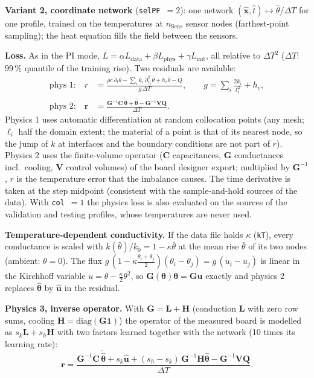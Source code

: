 \documentclass[11pt,a4paper]{article}
\newcommand{\mat}[1]{\bm{#1}}
\newcommand{\cfg}[1]{\texttt{#1}}
\begin{document}
\textbf{Variant 2, coordinate network} (\cfg{selPF}~$=2$): one network $(\hat{\bm x},\hat t)\mapsto\hat\theta/\Delta T$
for one profile, trained on the temperatures at $n_{\mathrm{Sens}}$ sensor nodes (farthest-point sampling); the heat
equation fills the field between the sensors.

\textbf{Loss.} As in the PI mode, $L=\alpha L_{\mathrm{data}}+\beta L_{\mathrm{phys}}+\gamma L_{\mathrm{init}}$, all
relative to $\Delta T^2$ ($\Delta T$: 99\,\% quantile of the training rise). Two residuals are available:
\begin{align}
  \text{phys 1:}\quad r&=\frac{\rho c\,\partial_t\hat\theta-\sum_i k_i\,\partial^2_{x_i}\hat\theta+h_v\hat\theta-Q}
  {g\,\Delta T},\qquad g=\sum_i\frac{2k_i}{\ell_i^2}+h_v,\\
  \text{phys 2:}\quad \bm r&=\frac{\mat G^{-1}\mat C\,\dot{\hat{\bm\theta}}+\hat{\bm\theta}-\mat G^{-1}\mat V\bm Q}
  {\Delta T}.
\end{align}
Physics 1 uses automatic differentiation at random collocation points (any mesh; $\ell_i$ half the domain extent; the
material of a point is that of its nearest node, so the jump of $k$ at interfaces and the boundary conditions are not
part of $r$). Physics 2 uses the finite-volume operator ($\mat C$ capacitances, $\mat G$ conductances incl.\ cooling,
$\mat V$ control volumes) of the board designer export; multiplied by $\mat G^{-1}$, $r$ is the temperature error that
the imbalance causes. The time derivative is taken at the step midpoint (consistent with the sample-and-hold sources
of the data). With \cfg{col}~$=1$ the physics loss is also evaluated on the sources of the validation and testing
profiles, whose temperatures are never used.

\textbf{Temperature-dependent conductivity.} If the data file holds $\kappa$ (\cfg{kT}), every conductance is
scaled with $k(\bar\theta)/k_0=1-\kappa\bar\theta$ at the mean rise $\bar\theta$ of its two nodes (ambient:
$\theta=0$). The flux $g\,(1-\kappa\frac{\theta_i+\theta_j}{2})(\theta_i-\theta_j)=g\,(u_i-u_j)$ is linear in the
Kirchhoff variable $u=\theta-\frac{\kappa}{2}\theta^2$, so $\mat G(\bm\theta)\bm\theta=\mat G\bm u$ exactly and physics
2 replaces $\hat{\bm\theta}$ by $\hat{\bm u}$ in the residual.

\textbf{Physics 3, inverse operator.} With $\mat G=\mat L+\mat H$ (conduction $\mat L$ with zero row sums, cooling
$\mat H=\mathrm{diag}(\mat G\bm 1)$) the operator of the measured board is modelled as $s_k\mat L+s_h\mat H$ with two
factors learned together with the network (10 times its learning rate):
\begin{equation}
  \bm r=\frac{\mat G^{-1}\mat C\,\dot{\hat{\bm\theta}}+s_k\hat{\bm u}+(s_h-s_k)\,\mat G^{-1}\mat H\hat{\bm\theta}
  -\mat G^{-1}\mat V\bm Q}{\Delta T}.
\end{equation}
\end{document}

